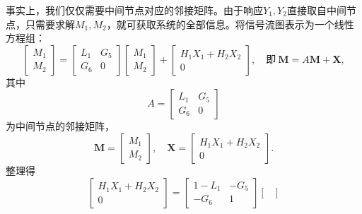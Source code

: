 \begin{example}
    事实上，我们仅仅需要中间节点对应的邻接矩阵。由于响应$Y_1,Y_2$直接取自中间节点，只需要求解$M_1,M_2$，就可获取系统的全部信息。将信号流图表示为一个线性方程组：
    \begin{equation}
        \begin{bmatrix}
            M_1 \\
            M_2
        \end{bmatrix}=
        \begin{bmatrix}
            L_1 & G_5\\
            G_6 & 0
        \end{bmatrix}
        \begin{bmatrix}
            M_1 \\
            M_2
        \end{bmatrix}+\begin{bmatrix}
            H_1 X_1 + H_2 X_2 \\
            0
        \end{bmatrix},\quad\text{即}\ \mathbf{M}=A\mathbf{M}+\mathbf{X},
    \end{equation}
    其中
    \begin{equation}
        A=\begin{bmatrix}
            L_1 & G_5\\
            G_6 & 0
        \end{bmatrix}
    \end{equation}
    为中间节点的邻接矩阵，
    \begin{equation}
        \mathbf{M}=\begin{bmatrix}
            M_1 \\
            M_2
        \end{bmatrix},\quad\mathbf{X}=\begin{bmatrix}
            H_1 X_1 + H_2 X_2 \\
            0
        \end{bmatrix}.
    \end{equation}
    整理得
    \begin{equation}
        \begin{bmatrix}
            H_1 X_1 + H_2 X_2 \\
            0
        \end{bmatrix}=\begin{bmatrix}
            1 -L_1 & -G_5\\
            -G_6 & 1
        \end{bmatrix}\begin{bmatrix}

\end{bmatrix}
\end{equation}
\end{example}
